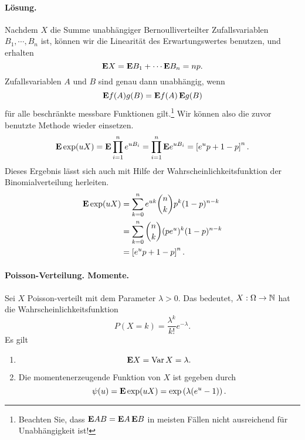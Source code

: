 \paragraph*{Lösung. }
Nachdem $X$ die Summe unabhängiger Bernoulliverteilter Zufallsvariablen $B_1,
\cdots, B_n$ ist, können wir die Linearität des Erwartungswertes benutzen, und
erhalten
\begin{equation*}
    \mathbf{E} X = \mathbf{E} B_1 + \cdots \mathbf{E} B_n = np. 
\end{equation*}
Zufallsvariablen $A$ und $B$ sind genau dann unabhängig, wenn 
\begin{equation*}
    \mathbf{E} f(A)g(B) = \mathbf{E} f(A)\, \mathbf{E} g(B)
\end{equation*}
für alle beschränkte messbare Funktionen gilt.\footnote{Beachten Sie, dass $\mathbf{E}
AB = \mathbf{E} A\, \mathbf{E} B$ in meisten Fällen nicht ausreichend für Unabhängigkeit ist!}
Wir können also die zuvor benutzte Methode wieder einsetzen. 
\begin{equation*}
    \mathbf{E} \exp (u X) = \mathbf{E} \prod_{i=1}^{n} e^{u B_i} 
    = \prod_{i=1}^{n} \mathbf{E} e^{u B_i} 
    = \left[ e^{u}p + 1 -p \right]^{n}.
\end{equation*}
Dieses Ergebnis lässt sich auch mit Hilfe der Wahrscheinlichkeitsfunktion der 
Binomialverteilung herleiten. 
\begin{align*}
    \mathbf{E} \exp (u X) &= \sum_{k=0}^{n} e^{u k} \binom{n}{k} p^{k}(1-p)^{n-k} \\
    &= \sum_{k=0}^{n} \binom{n}{k} (p e^{u})^{k}(1-p)^{n-k} \\
    &= \left[ e^u p + 1-p \right]^n.
\end{align*}

\paragraph{Poisson-Verteilung. Momente. } 
Sei $X$ Poisson-verteilt mit dem Parameter $\lambda>0$. Das bedeutet, $X:\Omega\to\mathbb N$
hat die Wahrscheinlichkeitsfunktion 
\begin{equation*}
    P(X = k) = \frac{\lambda^{k}}{k!} e^{-\lambda}.
\end{equation*}
Es gilt
\begin{enumerate}
    \item 
        \begin{equation*}
            \mathbf{E} X = \operatorname{Var} X = \lambda.
        \end{equation*}
    \item Die momentenerzeugende Funktion von $X$ ist gegeben durch
        \begin{equation*}
            \psi(u) = \mathbf{E} \exp(uX) = \exp \left( \lambda(e^u - 1) \right).
        \end{equation*}
\end{enumerate}


